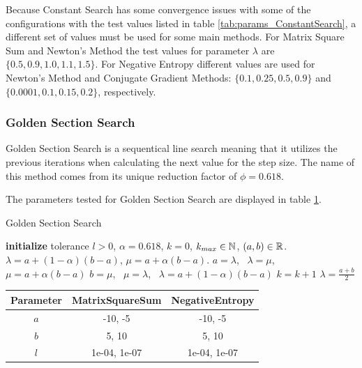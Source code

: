 \documentclass[a4paper,english,titlepage,12pt]{article}
\newcommand{\R}{\ensuremath\mathbb{R}}
\newcommand{\N}{\ensuremath\mathbb{N}}
\begin{document}
Because Constant Search has some convergence issues with some of the configurations with the test values listed in table \ref{tab:params_ConstantSearch}, a different set of values must be used for some main methods. For Matrix Square Sum and Newton's Method the test values for parameter $\lambda$ are $\{0.5, 0.9, 1.0, 1.1, 1.5\}$. For Negative Entropy different values are used for Newton's Method and Conjugate Gradient Methods: $\{0.1, 0.25, 0.5, 0.9\}$ and $\{0.0001, 0.1, 0.15, 0.2\}$, respectively.


\subsubsection{Golden Section Search}

Golden Section Search is a sequentical line search meaning that it utilizes the previous iterations when calculating the next value for the step size. The name of this method comes from its unique reduction factor of $\phi = 0.618$. \cite{book:nonlinear_programming}

The parameters tested for Golden Section Search are displayed in table \ref{tab:params_GoldenSectionSearch}.

\begin{algorithm}[H]
\caption{Golden Section Search}
\label{alg_golden_section}
\begin{algorithmic}[1]
\STATE \textbf{initialize} tolerance $l > 0$, $\alpha = 0.618$, $k = 0$, $k_{max} \in \N$, $(a, b) \in \R$.
\STATE $\lambda = a + (1 - \alpha) (b - a)$, $\mu = a + \alpha (b - a)$.
    \IF{$\theta(\lambda) > \theta(\mu)$}
        \STATE $a = \lambda$, \ $\lambda = \mu$, \ $\mu = a + \alpha (b - a)$
    \ELSE
        \STATE $b = \mu$, \ $\mu = \lambda$, \ $\lambda = a + (1 - \alpha) (b - a)$
    \ENDIF
    \STATE $k = k + 1$
\ENDWHILE
\RETURN $\lambda = \frac{a + b}{2}$
\end{algorithmic}
\end{algorithm}

\begin{table}[H]
\label{tab:params_GoldenSectionSearch}
\centering
{}
\begin{tabular}{|c|c|c|}
\hline
\rowcolor{gray!25}
Parameter & MatrixSquareSum & NegativeEntropy \\
\hline
$a$ & -10, -5 & -10, -5 \\
$b$ & 5, 10 & 5, 10 \\
$l$ & 1e-04, 1e-07 & 1e-04, 1e-07 \\
\hline
\end{tabular}
\end{table}
\end{document}
